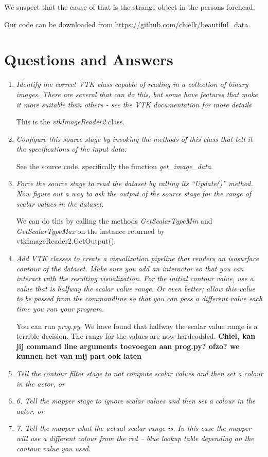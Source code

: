 \documentclass{article}[10pt]
\begin{document}
We suspect that the cause of that is the strange object in the persons forehead.

Our code can be downloaded from \url{https://github.com/chielk/beautiful_data}.

\section{Questions and Answers}
\begin{enumerate}
    \item \textit{Identify the correct VTK class capable of reading in a
collection of binary images. There are several that can do this, but some have
features that make it more suitable than others - see the VTK documentation for
more details}

This is the \emph{vtkImageReader2} class.

    \item \textit{Configure this source stage by invoking the methods of this
class that tell it the specifications of the input data:}

See the source code, specifically the function \emph{get\_image\_data}.

    \item \textit{Force the source stage to read the dataset by calling its
“Update()” method. Now figure out a way to ask the output of the source stage
for the range of scalar values in the dataset.}

We can do this by calling the methods \emph{GetScalarTypeMin} and
\textit{GetScalarTypeMax} on the instance returned by
vtkImageReader2.GetOutput().

    \item \textit{Add VTK classes to create a visualization pipeline that
renders an isosurface contour of the dataset. Make sure you add an interactor so
that you can interact with the resulting visualization. For the initial contour
value, use a value that is halfway the scalar value range.  Or even better;
allow this value to be passed from the commandline so that you can pass a
different value each time you run your program.}

You can run \emph{prog.py}. We have found that halfway the scalar value range is
a terrible decision. The range for the values are now hardcodded.
\textbf{Chiel, kan jij command line arguments toevoegen aan prog.py? ofzo? we
kunnen het van mij part ook laten}

    \item \textit{Tell the contour filter stage to not compute scalar values and
then set a colour in the actor, or}
    \item \textit{6. Tell the mapper stage to ignore scalar values and then set
a colour in the actor, or}
    \item \textit{7. Tell the mapper what the actual scalar range is. In this
case the mapper will use a different colour from the red – blue lookup table
depending on the contour value you used.}


\end{enumerate}
\end{document}
